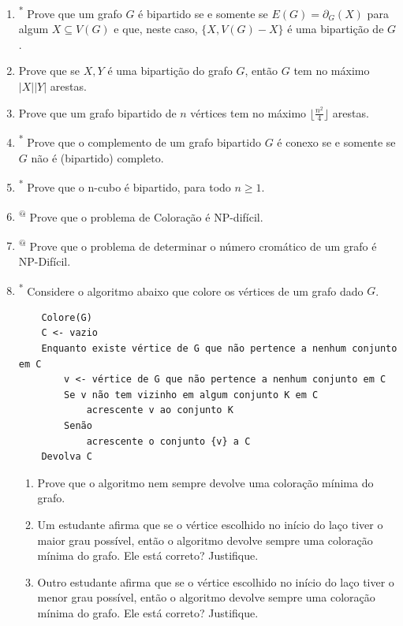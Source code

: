 \begin{enumerate}[label=\textbf{\arabic*.}, ref=\arabic*, resume]
    \item\textsuperscript{*} Prove que um grafo $G$ é bipartido se e somente se $E(G)=\partial_{G}(X)$ para algum $X\subseteq V(G)$ e que, neste caso, $\{X,V(G)-X\}$ é uma bipartição de $G$.
    
    \item Prove que se $X, Y$ é uma bipartição do grafo $G$, então $G$ tem no máximo $|X||Y|$ arestas. 
    
    \item Prove que um grafo bipartido de $n$ vértices tem no máximo $\lfloor\frac{n^{2}}{4}\rfloor$ arestas. 
    
    \item\textsuperscript{*} Prove que o complemento de um grafo bipartido $G$ é conexo se e somente se $G$ não é (bipartido) completo. 
    
    \item\textsuperscript{*} Prove que o n-cubo é bipartido, para todo $n\ge1$.
    
    \item\textsuperscript{@} Prove que o problema de Coloração é NP-difícil. 
    
    \item\textsuperscript{@} Prove que o problema de determinar o número cromático de um grafo é NP-Difícil. 
    
    \item\textsuperscript{*} Considere o algoritmo abaixo que colore os vértices de um grafo dado $G$. 
    \begin{verbatim}
    Colore(G)
    C <- vazio
    Enquanto existe vértice de G que não pertence a nenhum conjunto em C
        v <- vértice de G que não pertence a nenhum conjunto em C
        Se v não tem vizinho em algum conjunto K em C
            acrescente v ao conjunto K
        Senão
            acrescente o conjunto {v} a C
    Devolva C
    \end{verbatim} 
    \begin{enumerate}
        \item Prove que o algoritmo nem sempre devolve uma coloração mínima do grafo.
        \item Um estudante afirma que se o vértice escolhido no início do laço tiver o maior grau possível, então o algoritmo devolve sempre uma coloração mínima do grafo. Ele está correto? Justifique. 
        \item Outro estudante afirma que se o vértice escolhido no início do laço tiver o menor grau possível, então o algoritmo devolve sempre uma coloração mínima do grafo. Ele está correto? Justifique. 
    \end{enumerate}

\end{enumerate}

